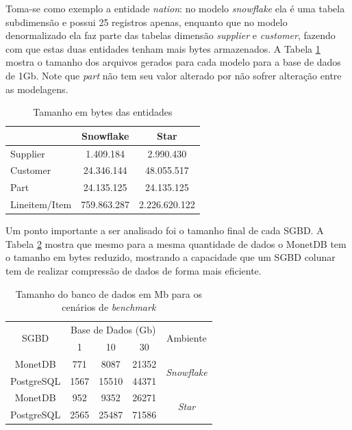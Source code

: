 Toma-se como exemplo a entidade \textit{nation}: no modelo \textit{snowflake} ela é uma tabela subdimensão e possui 25 registros apenas, enquanto que no modelo denormalizado ela faz parte das tabelas dimensão \textit{supplier} e \textit{customer}, fazendo com que estas duas entidades tenham mais bytes armazenados. A Tabela \ref{tab:tamanho} mostra o tamanho dos arquivos gerados para cada modelo para a base de dados de 1Gb. Note que \textit{part} não tem seu valor alterado por não sofrer alteração entre as modelagens.

\begin{table}[htpb]
\centering
\caption{Tamanho em bytes das entidades}
\label{tab:tamanho}
\begin{tabular}{@{}lcc@{}}
\toprule
              & Snowflake & Star       \\ \midrule
Supplier      & 1.409.184   & 2.990.430    \\
Customer      & 24.346.144  & 48.055.517   \\
Part          & 24.135.125  & 24.135.125   \\
Lineitem/Item & 759.863.287 & 2.226.620.122 \\ \bottomrule
\end{tabular}
\end{table}

Um ponto importante a ser analisado foi o tamanho final de cada SGBD. A Tabela \ref{tab:carregamento_size} 
mostra que mesmo para a mesma quantidade de dados o MonetDB tem o tamanho em bytes reduzido, mostrando a capacidade 
que um SGBD colunar tem de realizar compressão de dados de forma mais eficiente.

\begin{table}[htpb]
    \centering
    \caption{Tamanho do banco de dados em Mb para os cenários de \textit{benchmark}}
    \label{tab:carregamento_size}
    \begin{tabular}{c|ccc|c}
        \hline
        \multirow{2}{*}{SGBD} & \multicolumn{3}{c|}{Base de Dados (Gb)} & \multirow{2}{*}{Ambiente}  \\
                              & 1           & 10          & 30          &                            \\ \hline
        MonetDB               & 771         & 8087        & 21352       & \multirow{2}{*}{\textit{Snowflake}} \\
        PostgreSQL            & 1567        & 15510       & 44371       &                            \\ \hline
        MonetDB               & 952         & 9352        & 26271       & \multirow{2}{*}{\textit{Star}}      \\
        PostgreSQL            & 2565        & 25487       & 71586       &                            \\ \hline
        \end{tabular}
    \end{table}

